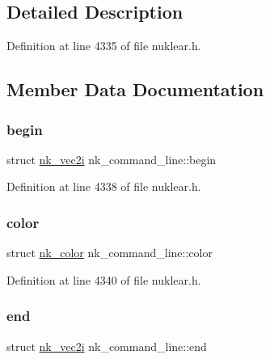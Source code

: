 \subsection{Detailed Description}


Definition at line 4335 of file nuklear.\+h.



\subsection{Member Data Documentation}
\mbox{\label{structnk__command__line_aaebd3121f997d61e5cd2afbd2a63258e}} 
\subsubsection{\texorpdfstring{begin}{begin}}
{\footnotesize\ttfamily struct \mbox{\hyperlink{structnk__vec2i}{nk\+\_\+vec2i}} nk\+\_\+command\+\_\+line\+::begin}



Definition at line 4338 of file nuklear.\+h.

\mbox{\label{structnk__command__line_abc13f5b8ba019c8b0ef619ee8a3fc73d}} 
\subsubsection{\texorpdfstring{color}{color}}
{\footnotesize\ttfamily struct \mbox{\hyperlink{structnk__color}{nk\+\_\+color}} nk\+\_\+command\+\_\+line\+::color}



Definition at line 4340 of file nuklear.\+h.

\mbox{\label{structnk__command__line_abae974f2c6c475c9cdd5d19e8c5a3ba1}} 
\subsubsection{\texorpdfstring{end}{end}}
{\footnotesize\ttfamily struct \mbox{\hyperlink{structnk__vec2i}{nk\+\_\+vec2i}} nk\+\_\+command\+\_\+line\+::end}



